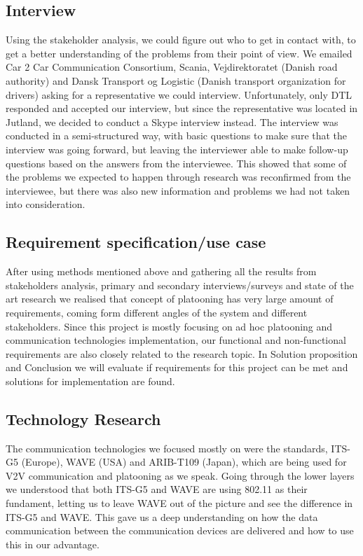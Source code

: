 \subsection{Interview}
Using the stakeholder analysis, we could figure out who to get in contact with, to get a better understanding of the problems from their point of view. We emailed Car 2 Car Communication Consortium, Scania, Vejdirektoratet (Danish road authority) and Dansk Transport og Logistic (Danish transport organization for drivers) asking for a representative we could interview.
Unfortunately, only DTL responded and accepted our interview, but since the representative was located in Jutland, we decided to conduct a Skype interview instead. The interview was conducted in a semi-structured way, with basic questions to make sure that the interview was going forward, but leaving the interviewer able to make follow-up questions based on the answers from the interviewee. This showed that some of the problems we expected to happen through research was reconfirmed from the interviewee, but there was also new information and problems we had not taken into consideration.
% 
\subsection{Requirement specification/use case}
After using methods mentioned above and gathering all the results from stakeholders analysis, primary and secondary interviews/surveys and state of the art research we realised that concept of platooning has very large amount of requirements, coming form different angles of the system and different stakeholders. Since this project is mostly focusing on ad hoc platooning and communication technologies implementation, our functional and non-functional requirements are also closely related to the research topic. In Solution proposition and Conclusion we will evaluate if requirements for this project can be met and solutions for implementation are found.
% 
\subsection{Technology Research}
The communication technologies we focused mostly on were the standards, ITS-G5 (Europe), WAVE (USA) and ARIB-T109 (Japan), which are being used for V2V communication and platooning as we speak. Going through the lower layers we understood that both ITS-G5 and WAVE are using 802.11 as their fundament, letting us to leave WAVE out of the picture and see the difference in ITS-G5 and WAVE. This gave us a deep understanding on how the data communication between the communication devices are delivered and how to use this in our advantage.

